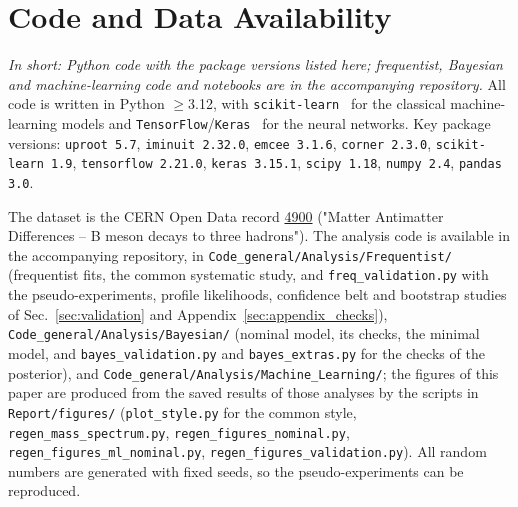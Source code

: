 \section{Code and Data Availability}
\label{sec:code}
\emph{In short: Python code with the package versions listed here; frequentist, Bayesian and machine-learning code and notebooks are in the accompanying repository.}
All code is written in Python $\geq$3.12, with \texttt{scikit-learn}~\cite{sklearn} for the classical machine-learning models and \texttt{TensorFlow}/\texttt{Keras}~\cite{tensorflow} for the neural networks. Key package versions: \texttt{uproot 5.7}, \texttt{iminuit 2.32.0}, \texttt{emcee 3.1.6}, \texttt{corner 2.3.0}, \texttt{scikit-learn 1.9}, \texttt{tensorflow 2.21.0}, \texttt{keras 3.15.1}, \texttt{scipy 1.18}, \texttt{numpy 2.4}, \texttt{pandas 3.0}.

The dataset is the CERN Open Data record \href{https://opendata.cern.ch/record/4900}{4900} ("Matter Antimatter Differences -- B meson decays to three hadrons"). The analysis code is available in the accompanying repository, in \texttt{Code\_general/Analysis/Frequentist/} (frequentist fits, the common systematic study, and \texttt{freq\_validation.py} with the pseudo-experiments, profile likelihoods, confidence belt and bootstrap studies of Sec.~\ref{sec:validation} and Appendix~\ref{sec:appendix_checks}), \texttt{Code\_general/Analysis/Bayesian/} (nominal model, its checks, the minimal model, and \texttt{bayes\_validation.py} and \texttt{bayes\_extras.py} for the checks of the posterior), and \texttt{Code\_general/Analysis/Machine\_Learning/}; the figures of this paper are produced from the saved results of those analyses by the scripts in \texttt{Report/figures/} (\texttt{plot\_style.py} for the common style, \texttt{regen\_mass\_spectrum.py}, \texttt{regen\_figures\_nominal.py}, \texttt{regen\_figures\_ml\_nominal.py}, \texttt{regen\_figures\_validation.py}). All random numbers are generated with fixed seeds, so the pseudo-experiments can be reproduced.
